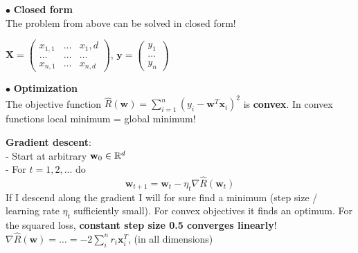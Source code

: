 \documentclass[a4paper, fontsize=8pt, landscape, DIV=1]{scrartcl}
\begin{document}
\begin{multicols*}{4}

		\columnbreak
		
		$\bullet$ \textbf{Closed form}\\
		The problem from above can be solved in closed form!
		

		$\textbf{X}=\begin{pmatrix} x_{1,1} & \dots & x_1,d \\ \dots & \dots & \dots \\ x_{n,1} & \dots & x_{n,d} \end{pmatrix}$, $\textbf{y}=\begin{pmatrix} y_1 \\ \dots \\ y_n \end{pmatrix}$\\
		\vspace{0.1cm}
		
		$\bullet$ \textbf{Optimization}\\
		The objective function $\hat{R}(\textbf{w})=\sum_{i=1}^{n}(y_i-\textbf{w}^T\textbf{x}_i)^2$ is \textbf{convex}. In convex functions local minimum = global minimum!
		\vspace{0.1cm}
		
		\textbf{Gradient descent}:\\
		- Start at arbitrary $\textbf{w}_0 \in \mathbb{R}^d$\\
		- For $t=1,2,...$ do
		\begin{equation*}
			\textbf{w}_{t+1}=\textbf{w}_t-\eta_t\nabla\hat{R}(\textbf{w}_t)
		\end{equation*}
		If I descend along the gradient I will for sure find a minimum (step size / learning rate $\eta_t$ sufficiently small). For convex objectives it finds an optimum. For the squared loss, \textbf{constant step size 0.5 converges linearly}!\\
		$\nabla\hat{R}(\textbf{w})=\dots=-2\sum_{i}^{n}r_i\textbf{x}_i^T$, (in all dimensions)
		\vspace{0.1cm}
		

\end{multicols*}
\end{document}

